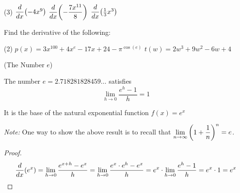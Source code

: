 \documentclass[mathNotesPreamble]{subfiles}
\begin{document}
\begin{center}
\end{center}
\begin{ex*}\ 

  \begin{tasks}(3)
    \task[] $\dfrac{d}{dx}{\left(-4x^9\right)}$
    \task[] $\dfrac{d}{dx}{\left(-\dfrac{7x^{11}}{8}\right)}$
    \task[] $\dfrac{d}{dx}{\left(\frac{1}{3}x^3\right)}$
  \end{tasks}
\end{ex*}
\begin{center}
\end{center}
\begin{ex*}
  Find the derivative of the following:
  
  \begin{tasks}(2)
    \task[] $p(x)=3x^{100}+4x^e-17x+24-\pi^{\cos(e)}$
    \task[] $t(w)=2w^3+9w^2-6w+4$
  \end{tasks}
\end{ex*}
\pagebreak
\begin{defn*}(The Number $e$)

  The number $e=2.718281828459\dots$ satisfies
    $$\lim_{h\to 0} \dfrac{e^h-1}{h}=1$$

  It is the base of the natural exponential function $f(x)=e^x$
\end{defn*}
\textit{Note:} One way to show the above result is to recall that $\displaystyle\lim_{n\to \infty} {\left(1+\dfrac{1}{n}\right)}^n=e$.
\vspace*{30pt}
\begin{center}
\end{center}
\vspace*{20pt}
\begin{proof}
  $$\dfrac{d}{dx}{\left(e^x\right)}
      =\lim_{h\to 0}\dfrac{e^{x+h}-e^x}{h}
      =\lim_{h\to 0} \dfrac{e^x\cdot e^h-e^x}{h}
      =e^x\cdot\lim_{h\to 0} \dfrac{e^h-1}{h}
      =e^x\cdot 1=e^x$$
\end{proof}
\end{document}
